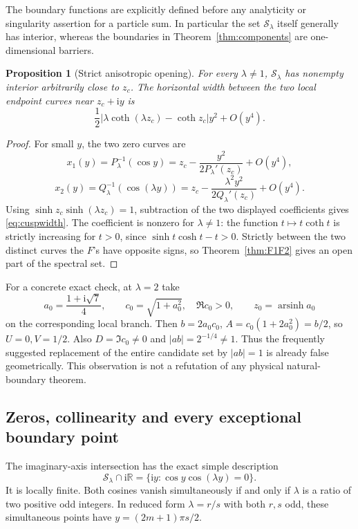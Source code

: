 \documentclass[11pt]{article}
\numberwithin{equation}{section}
\newtheorem{proposition}[theorem]{Proposition}
\theoremstyle{definition}
\newcommand{\R}{\mathbb R}
\newcommand{\ii}{\mathrm i}
\newcommand{\cS}{\mathcal S}
\begin{document}
The boundary functions are explicitly defined before any analyticity
or singularity assertion for a particle sum. In particular the set
\(\cS_\lambda\) itself generally has interior, whereas the boundaries
in Theorem~\ref{thm:components} are one-dimensional barriers.

\begin{proposition}[Strict anisotropic opening]\label{prop:anisotropicarea}
For every \(\lambda\ne1\), \(\cS_\lambda\) has nonempty interior
arbitrarily close to \(z_c\). The horizontal width between the two
local endpoint curves near \(z_c+\ii y\) is
\begin{equation}\label{eq:cuspwidth}
 \frac12\bigl|\lambda\coth(\lambda z_c)-\coth z_c\bigr|y^2
       +O(y^4).
\end{equation}
\end{proposition}
\begin{proof}
For small \(y\), the two zero curves are
\[
 x_1(y)=P_\lambda^{-1}(\cos y)
      =z_c-\frac{y^2}{2P_\lambda'(z_c)}+O(y^4),
\]
\[
 x_2(y)=Q_\lambda^{-1}(\cos(\lambda y))
      =z_c-\frac{\lambda^2y^2}{2Q_\lambda'(z_c)}+O(y^4).
\]
Using \(\sinh z_c\sinh(\lambda z_c)=1\), subtraction of the two
displayed coefficients gives \eqref{eq:cuspwidth}. The coefficient
is nonzero for \(\lambda\ne1\): the function
\(t\mapsto t\coth t\) is strictly increasing for \(t>0\), since
\(\sinh t\cosh t-t>0\). Strictly between the two distinct curves
the \(F\)'s have opposite signs, so Theorem~\ref{thm:F1F2} gives
an open part of the spectral set.
\end{proof}

For a concrete exact check, at \(\lambda=2\) take
\[
 a_0=\frac{1+\ii\sqrt7}{4},\qquad c_0=\sqrt{1+a_0^2},\quad
 \Re c_0>0,\qquad z_0=\operatorname{arsinh}a_0
\]
on the corresponding local branch. Then \(b=2a_0c_0\),
\(A=c_0(1+2a_0^2)=b/2\), so \(U=0,V=1/2\).
Also \(D=\Im c_0\ne0\) and \(|ab|=2^{-1/4}\ne1\).
Thus the frequently suggested replacement of the entire candidate
set by \(|ab|=1\) is already false geometrically. This observation is
not a refutation of any physical natural-boundary theorem.

\subsection{Zeros, collinearity and every exceptional boundary point}

The imaginary-axis intersection has the exact simple description
\begin{equation}\label{eq:imagaxisS}
 \cS_\lambda\cap\ii\R
 =\{\ii y:\cos y\cos(\lambda y)=0\}.
\end{equation}
It is locally finite. Both cosines vanish simultaneously if and only
if \(\lambda\) is a ratio of two positive odd integers. In reduced
form \(\lambda=r/s\) with both \(r,s\) odd, these simultaneous
points have \(y=(2m+1)\pi s/2\).
\end{document}
